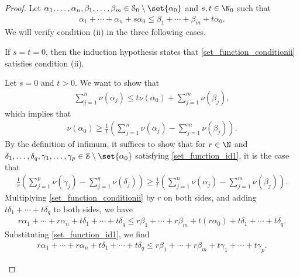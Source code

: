 \begin{proof}
  Let $\alpha_1,\dots,\alpha_n,\beta_1,\dots,\beta_m\in \mathcal{S}_0\setminus \set{\alpha_0}$ and $s,t\in \N_0$ such that
  \begin{align*}
    \alpha_1 + \cdots + \alpha_n + s\alpha_0 \leq \beta_1 + \cdots + \beta_m + t\alpha_0.\label{set_function_conditionii}\tag*{(\textasteriskcentered)}
  \end{align*}
  We will verify condition (ii) in the three following cases.
  \begin{description}[font=\normalfont\scshape,leftmargin=0cm]
    \item[Case 0:] If $s = t = 0$, then the induction hypothesis states that \ref{set_function_conditionii} satisfies condition (ii).
    \item[Case 1:] Let $s = 0$ and $t > 0$. We want to show that
      \begin{align*}
        \sum_{j=1}^{n}\nu\left(\alpha_j\right) \leq t\nu\left(\alpha_0\right) + \sum_{j=1}^{m}\nu\left(\beta_j\right),
      \end{align*}
      which implies that
      \begin{align*}
        \nu\left(\alpha_0\right) \geq \frac{1}{t}\left(\sum_{j=1}^{n}\nu\left(\alpha_j\right) - \sum_{j=1}^{m}\nu\left(\beta_j\right)\right).
      \end{align*}
      By the definition of infimum, it suffices to show that for $r\in \N$ and $\delta_1,\dots,\delta_q,\gamma_1,\dots,\gamma_p\in \mathcal{S}\setminus \set{\alpha_0}$ satisfying \ref{set_function_id1}, it is the case that
      \begin{align*}
        \frac{1}{r}\left(\sum_{j=1}^{p}\nu\left(\gamma_j\right)-\sum_{j=1}^{q}\nu\left(\delta_j\right)\right) \geq \frac{1}{t}\left(\sum_{j=1}^{n}\nu\left(\alpha_j\right) - \sum_{j=1}^{m}\nu\left(\beta_j\right)\right).
      \end{align*}
      Multiplying \ref{set_function_conditionii} by $r$ on both sides, and adding $t\delta_1 + \cdots + t\delta_q$ to both sides, we have
      \begin{align*}
        r\alpha_1 + \cdots + r\alpha_n + t\delta_1 + \cdots + t\delta_q \leq r\beta_1 + \cdots + r\beta_m + t\left(r\alpha_0\right) + t\delta_1 + \cdots + t\delta_q.
      \end{align*}
      Substituting \ref{set_function_id1}, we find
      \begin{align*}
        r\alpha_1 + \cdots + r\alpha_n + t\delta_1 + \cdots + t\delta_q \leq r\beta_1 + \cdots + r\beta_m + t\gamma_1 + \cdots + t\gamma_p.
      \end{align*}

\end{description}
\end{proof}
